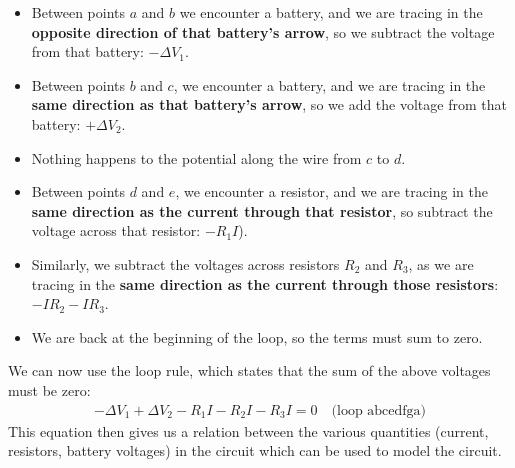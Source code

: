 \begin{itemize}
\item Between points $a$ and $b$ we encounter a battery, and we are tracing in the \textbf{opposite direction of that battery's arrow}, so we subtract the voltage from that battery: $-\Delta V_1$.
\item Between points $b$ and $c$, we encounter a battery, and we are tracing in the \textbf{same direction as that battery's arrow}, so we add the voltage from that battery: $+\Delta V_2$.
\item Nothing happens to the potential along the wire from $c$ to $d$.
\item Between points $d$ and $e$, we encounter a resistor, and we are tracing in the \textbf{same direction as the current through that resistor}, so subtract the voltage across that resistor: $-R_1I$).
\item Similarly, we subtract the voltages across resistors $R_2$ and $R_3$, as we are tracing in the \textbf{same direction as the current through those resistors}: $-IR_2-IR_3$.
\item We are back at the beginning of the loop, so the terms must sum to zero.
\end{itemize}
We can now use the loop rule, which states that the sum of the above voltages must be zero:
\begin{align*}
-\Delta V_1 + \Delta V_2 - R_1I - R_2I - R_3I = 0\quad \text{(loop abcedfga)}
\end{align*}
This equation then gives us a relation between the various quantities (current, resistors, battery voltages) in the circuit which can be used to model the circuit.  

